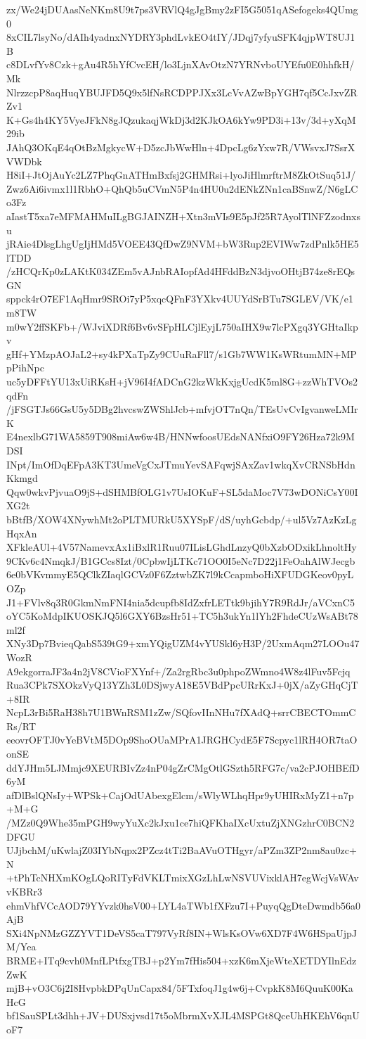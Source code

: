 zx/We24jDUAasNeNKm8U9t7ps3VRVlQ4gJgBmy2zFI5G5051qASefogeks4QUmg0
8xCIL7lsyNo/dAIh4yadnxNYDRY3phdLvkEO4tIY/JDqj7yfyuSFK4qjpWT8UJ1B
c8DLvfYv8Czk+gAu4R5hYfCvcEH/lo3LjnXAvOtzN7YRNvboUYEfu0E0hhfkH/Mk
NlrzzcpP8aqHuqYBUJFD5Q9x5lfNsRCDPPJXx3LcVvAZwBpYGH7qf5CcJxvZRZv1
K+Gs4h4KY5VyeJFkN8gJQzukaqjWkDj3d2KJkOA6kYw9PD3i+13v/3d+yXqM29ib
JAhQ3OKqE4qOtBzMgkycW+D5zcJbWwHln+4DpcLg6zYxw7R/VWsvxJ7SsrXVWDbk
H8iI+JtOjAuYc2LZ7PhqGnATHmBxfsj2GHMRsi+lyoJiHlmrftrM8ZkOtSuq51J/
Zwz6Ai6ivmx1l1RbhO+QhQb5uCVmN5P4n4HU0u2dENkZNn1caBSnwZ/N6gLCo3Fz
aIastT5xa7eMFMAHMuILgBGJAINZH+Xtn3mVIs9E5pJf25R7AyolTlNFZzodnxsu
jRAie4DlsgLhgUgIjHMd5VOEE43QfDwZ9NVM+bW3Rup2EVIWw7zdPnlk5HE5lTDD
/zHCQrKp0zLAKtK034ZEm5vAJnbRAIopfAd4HFddBzN3djvoOHtjB74ze8rEQsGN
sppck4rO7EF1AqHmr9SROi7yP5xqcQFnF3YXkv4UUYdSrBTu7SGLEV/VK/e1m8TW
m0wY2ffSKFb+/WJviXDRf6Bv6vSFpHLCjlEyjL750aIHX9w7lcPXgq3YGHtaIkpv
gHf+YMzpAOJaL2+sy4kPXaTpZy9CUuRaFll7/s1Gb7WW1KsWRtumMN+MPpPihNpc
uc5yDFFtYU13xUiRKsH+jV96I4fADCnG2kzWkKxjgUcdK5ml8G+zzWhTVOs2qdFn
/jFSGTJs66GsU5y5DBg2hvcswZWShlJcb+mfvjOT7nQn/TEsUvCvIgvanweLMIrK
E4nexlbG71WA5859T908miAw6w4B/HNNwfoosUEdsNANfxiO9FY26Hza72k9MDSI
INpt/ImOfDqEFpA3KT3UmeVgCxJTmuYevSAFqwjSAxZav1wkqXvCRNSbHdnKkmgd
Qqw0wkvPjvuaO9jS+dSHMBfOLG1v7UsIOKuF+SL5daMoc7V73wDONiCsY00IXG2t
bBtfB/XOW4XNywhMt2oPLTMURkU5XYSpF/dS/uyhGcbdp/+ul5Vz7AzKzLgHqxAn
XFkleAUl+4V57NamevxAx1iBxlR1Ruu07ILisLGhdLnzyQ0bXzbODxikLhnoltHy
9CKv6c4NmqkJ/B1GCcs8Izt/0CpbwIjLTKc71OO0I5eNc7D22j1FeOahAlWJecgb
6e0bVKvmmyE5QClkZIaqlGCVz0F6ZztwbZK7l9kCcapmboHiXFUDGKeov0pyLOZp
J1+FVlv8q3R0GkmNmFNI4nia5dcupfb8IdZxfrLETtk9bjihY7R9RdJr/aVCxnC5
oYC5KoMdpIKUOSKJQ5l6GXY6BzsHr51+TC5h3ukYn1lYh2FhdeCUzWsABt78ml2f
XNy3Dp7BvieqQabS539tG9+xmYQigUZM4vYUSkl6yH3P/2UxmAqm27LOOu47WozR
A9ekgorraJF3a4n2jV8CVioFXYnf+/Za2rgRbc3u0phpoZWmno4W8z4lFuv5Fcjq
Rua3CPk7SXOkzVyQ13YZh3L0DSjwyA18E5VBdPpcURrKxJ+0jX/aZyGHqCjT+8IR
NcpL3rBi5RaH38h7U1BWnRSM1zZw/SQfovIInNHu7fXAdQ+srrCBECTOmmCRs/RT
eeovrOFTJ0vYeBVtM5DOp9ShoOUaMPrA1JRGHCydE5F7Scpyc1lRH4OR7taOonSE
ddYJHm5LJMmjc9XEURBIvZz4nP04gZrCMgOtlGSzth5RFG7c/va2cPJOHBEfD6yM
afDlBslQNsIy+WPSk+CajOdUAbexgElcm/sWlyWLhqHpr9yUHIRxMyZ1+n7p+M+G
/MZz0Q9Whe35mPGH9wyYuXc2kJxu1ce7hiQFKhaIXcUxtuZjXNGzhrC0BCN2DFGU
UJjbchM/uKwlajZ03IYbNqpx2PZcz4tTi2BaAVuOTHgyr/aPZm3ZP2nm8au0zc+N
+tPhTcNHXmKOgLQoRITyFdVKLTmixXGzLhLwNSVUVixklAH7egWcjVsWAvvKBRr3
ehmVhfVCcAOD79YYvzk0hsV00+LYL4aTWb1fXFzu7I+PuyqQgDteDwmdb56a0AjB
SXi4NpNMzGZZYVT1DeVS5caT797VyRf8IN+WlsKsOVw6XD7F4W6HSpaUjpJM/Yea
BRME+ITq9cvh0MnfLPtfxgTBJ+p2Ym7fHis504+xzK6mXjeWteXETDYIlnEdzZwK
mjB+vO3C6j2I8HvpbkDPqUnCapx84/5FTxfoqJ1g4w6j+CvpkK8M6QuuK00KaHcG
bf1SauSPLt3dhh+JV+DUSxjvsd17t5oMbrmXvXJL4MSPGt8QceUhHKEhV6qnUoF7

